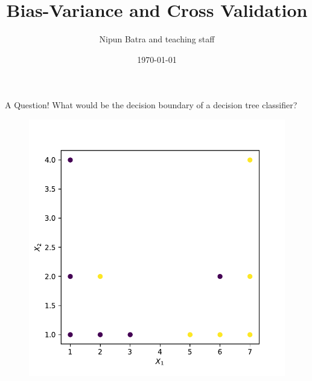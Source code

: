 \documentclass{beamer}
\title{Bias-Variance and Cross Validation}
\date{\today}
\author{Nipun Batra and teaching staff}
\institute{IIT Gandhinagar}
\begin{document}
	\maketitle

	\begin{frame}{A Question!}
	What would be the decision boundary of a decision tree classifier? 
		
	\begin{figure}
		\centering
	\includegraphics[scale=0.55]{dataset-1}
	\end{figure}


	\end{frame}
\end{document}
